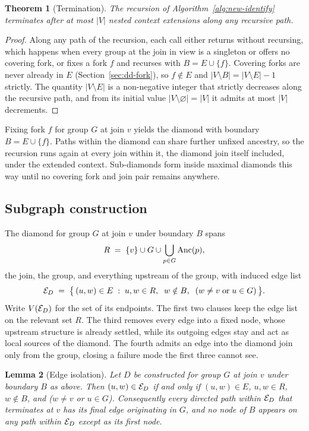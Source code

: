 \documentclass[12pt]{report}
\newtheorem{theorem}{Theorem}
\newtheorem{lemma}[theorem]{Lemma}
\begin{document}
\begin{theorem}[Termination]
\label{thm:termination}
The recursion of Algorithm~\ref{alg:new-identify} terminates after at most $|V|$ nested context extensions along any recursive path.
\end{theorem}

\begin{proof}
Along any path of the recursion, each call either returns without recursing, which happens when every group at the join in view is a singleton or offers no covering fork, or fixes a fork $f$ and recurses with $B = E \cup \{f\}$. Covering forks are never already in $E$ (Section~\ref{sec:dd-fork}), so $f \notin E$ and $|V \setminus B| = |V \setminus E| - 1$ strictly. The quantity $|V \setminus E|$ is a non-negative integer that strictly decreases along the recursive path, and from its initial value $|V \setminus \varnothing| = |V|$ it admits at most $|V|$ decrements.
\end{proof}

Fixing fork $f$ for group $G$ at join $v$ yields the diamond with boundary $B = E \cup \{f\}$. Paths within the diamond can share further unfixed ancestry, so the recursion runs again at every join within it, the diamond join itself included, under the extended context. Sub-diamonds form inside maximal diamonds this way until no covering fork and join pair remains anywhere.

\subsection{Subgraph construction}
\label{sec:dd-edges}

The diamond for group $G$ at join $v$ under boundary $B$ spans
\[
R \;=\; \{v\} \cup G \cup \bigcup_{p \in G}\mathrm{Anc}(p),
\]
the join, the group, and everything upstream of the group, with induced edge list
\[
\mathcal{E}_D \;=\; \bigl\{\, (u,w) \in E \;:\; u,w \in R,\;\; w \notin B,\;\; (w \neq v \;\text{or}\; u \in G) \,\bigr\}.
\]
Write $V(\mathcal{E}_D)$ for the set of its endpoints. The first two clauses keep the edge list on the relevant set $R$. The third removes every edge into a fixed node, whose upstream structure is already settled, while its outgoing edges stay and act as local sources of the diamond. The fourth admits an edge into the diamond join only from the group, closing a failure mode the first three cannot see.

\begin{lemma}[Edge isolation]
\label{lem:isolation}
Let $D$ be constructed for group $G$ at join $v$ under boundary $B$ as above. Then $(u,w) \in \mathcal{E}_D$ if and only if $(u,w)\in E$, $u,w \in R$, $w \notin B$, and ($w \neq v$ or $u \in G$). Consequently every directed path within $\mathcal{E}_D$ that terminates at $v$ has its final edge originating in $G$, and no node of $B$ appears on any path within $\mathcal{E}_D$ except as its first node.
\end{lemma}
\end{document}
